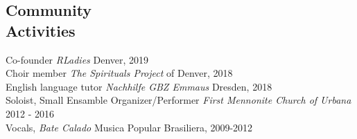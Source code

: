 \documentclass[margin, 10pt]{CVStyleTemplate}\usepackage[]{graphicx}\usepackage[dvipsnames]{xcolor}
\begin{document}
\begin{resume}
%








\section{Community \\ Activities}

Co-founder \emph{RLadies} Denver, 2019 \\
Choir member \emph{The Spirituals Project} of Denver, 2018 \\
English language tutor \emph{Nachhilfe GBZ Emmaus} Dresden, 2018 \\
Soloist, Small Ensamble Organizer/Performer \emph{First Mennonite Church of Urbana} 2012 - 2016\\
Vocals, \emph{Bate Calado} Musica Popular Brasiliera, 2009-2012\\


\end{resume}
\end{document}
